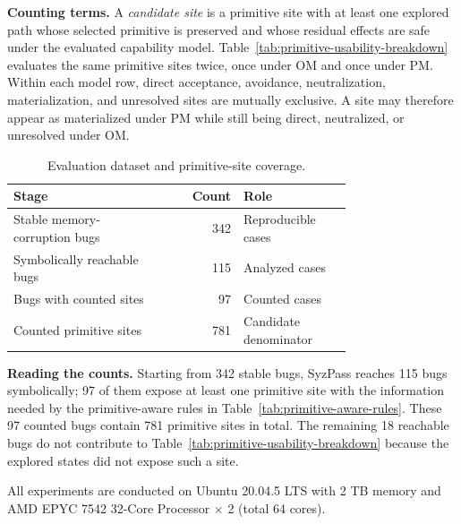 \noindent\textbf{Counting terms.} A \emph{candidate site} is a primitive site with at least one explored path whose selected primitive is preserved and whose residual effects are safe under the evaluated capability model. Table~\ref{tab:primitive-usability-breakdown} evaluates the same primitive sites twice, once under OM and once under PM. Within each model row, direct acceptance, avoidance, neutralization, materialization, and unresolved sites are mutually exclusive. A site may therefore appear as materialized under PM while still being direct, neutralized, or unresolved under OM.

\begin{table}[!ht]
  \centering
  \small
  \setlength{\tabcolsep}{3pt}
  \renewcommand{\arraystretch}{1.08}
  \begin{tabular}{@{}p{0.43\linewidth}r p{0.32\linewidth}@{}}
    \toprule
    \textbf{Stage} & \textbf{Count} & \textbf{Role} \\
    \midrule
    Stable memory-corruption bugs & 342 & Reproducible cases \\
    Symbolically reachable bugs & 115 & Analyzed cases \\
    Bugs with counted sites & 97 & Counted cases \\
    Counted primitive sites & 781 & Candidate denominator \\
    \bottomrule
  \end{tabular}
  \caption{Evaluation dataset and primitive-site coverage.}
  \label{tab:dataset-coverage}
\end{table}

\noindent\textbf{Reading the counts.} Starting from 342 stable bugs, SyzPass reaches 115 bugs symbolically; 97 of them expose at least one primitive site with the information needed by the primitive-aware rules in Table~\ref{tab:primitive-aware-rules}. These 97 counted bugs contain 781 primitive sites in total. The remaining 18 reachable bugs do not contribute to Table~\ref{tab:primitive-usability-breakdown} because the explored states did not expose such a site.

All experiments are conducted on Ubuntu 20.04.5 LTS with 2 TB memory and AMD EPYC 7542 32-Core Processor × 2 (total 64 cores). 





